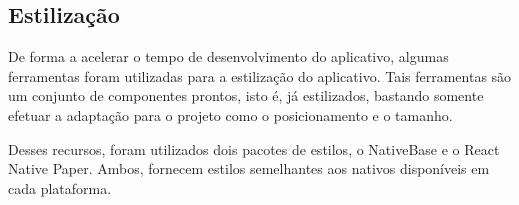 
\subsection{Estilização}

De forma a acelerar o tempo de desenvolvimento do aplicativo, algumas ferramentas foram utilizadas para a estilização do aplicativo. Tais ferramentas são um conjunto de componentes prontos, isto é, já estilizados, bastando somente efetuar a adaptação para o projeto como o posicionamento e o tamanho.

Desses recursos, foram utilizados dois pacotes de estilos, o NativeBase e o React Native Paper. Ambos, fornecem estilos semelhantes aos nativos disponíveis em cada plataforma.


